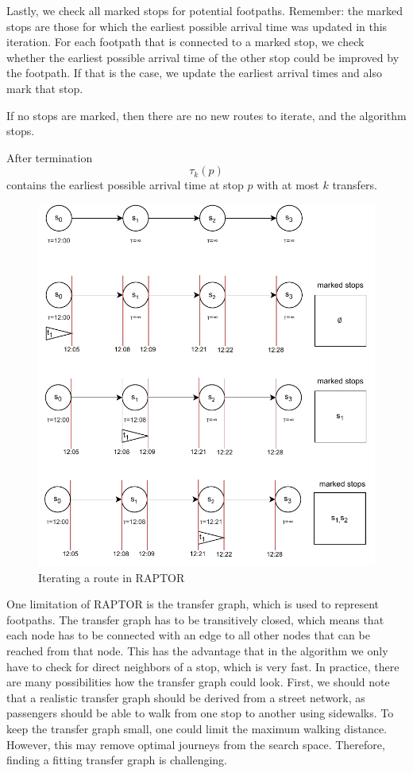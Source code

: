 Lastly, we check all marked stops for potential footpaths.
Remember: the marked stops are those for which the earliest possible arrival time was updated in this iteration.
For each footpath that is connected to a marked stop, we check whether the earliest possible arrival time of the other stop could be improved by the footpath.
If that is the case, we update the earliest arrival times and also mark that stop.

If no stops are marked, then there are no new routes to iterate, and the algorithm stops.

After termination \[\tau_k(p)\] contains the earliest possible arrival time at stop \(p\) with at most \(k\) transfers.

\begin{figure}
    \centering
    \includegraphics{Figures/related_work/raptor.pdf}
    \caption{Iterating a route in RAPTOR}
    \label{fig:raptor}
\end{figure}

One limitation of RAPTOR is the transfer graph, which is used to represent footpaths.
The transfer graph has to be transitively closed, which means that each node has to be connected with an edge to all other nodes that can be reached from that node.
This has the advantage that in the algorithm we only have to check for direct neighbors of a stop, which is very fast.
In practice, there are many possibilities how the transfer graph could look.
First, we should note that a realistic transfer graph should be derived from a street network, as passengers should be able to walk from one stop to another using sidewalks.
To keep the transfer graph small, one could limit the maximum walking distance.
However, this may remove optimal journeys from the search space.
Therefore, finding a fitting transfer graph is challenging.

